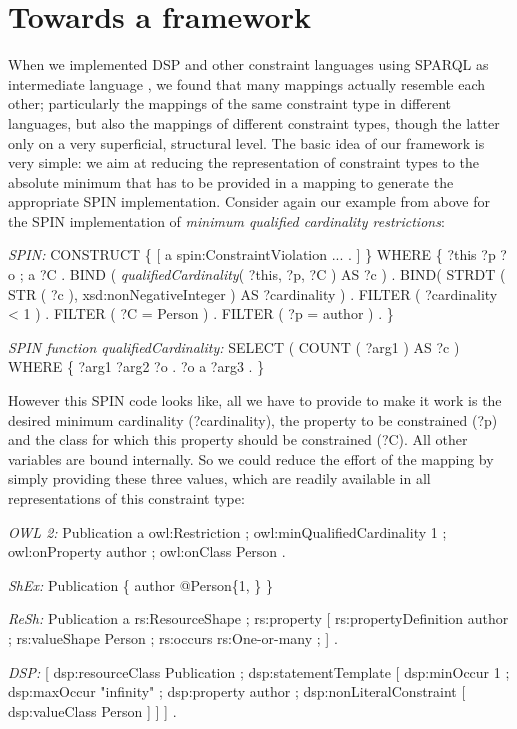\documentclass[a4paper,fontsize=11pt]{scrartcl}
\begin{document}
\section{Towards a framework} 
\label{sec:vocabulary}

When we implemented DSP and other constraint languages using SPARQL as intermediate language \cite{BoschEckert2014-2}, we found that many mappings actually resemble each other; particularly the mappings of the same constraint type in different languages, but also the mappings of different constraint types, though the latter only on a very superficial, structural level. The basic idea of our framework is very simple: we aim at reducing the representation of constraint types to the absolute minimum that has to be provided in a mapping to generate the appropriate SPIN implementation. Consider again our example from above for the SPIN implementation of \emph{minimum qualified cardinality restrictions}:

\begin{ex}[commandchars=\\\{\}]
\textit{SPIN:} CONSTRUCT \{ [ a spin:ConstraintViolation ... . ] \} WHERE \{ 
          ?this ?p ?o ; a ?C .
          BIND ( \textit{qualifiedCardinality}( ?this, ?p, ?C ) AS ?c ) .
          BIND( STRDT ( STR ( ?c ), xsd:nonNegativeInteger ) AS ?cardinality ) .
          FILTER ( ?cardinality < 1 ) . 
          FILTER ( ?C = Person ) .
          FILTER ( ?p = author ) . \}
						
\textit{SPIN function qualifiedCardinality:}										
SELECT ( COUNT ( ?arg1 ) AS ?c ) WHERE \{ ?arg1 ?arg2 ?o . ?o a ?arg3 . \}
\end{ex}

However this SPIN code looks like, all we have to provide to make it work is the desired minimum cardinality (?cardinality), the property to be constrained (?p) and the class for which this property should be constrained (?C). All other variables are bound internally. So we could reduce the effort of the mapping by simply providing these three values, which are readily available in all representations of this constraint type:

\begin{ex}[commandchars=\\\{\}]
\textit{OWL 2:} Publication a owl:Restriction ;
          owl:minQualifiedCardinality 1 ;
          owl:onProperty author ;
          owl:onClass Person .
		
\textit{ShEx:} Publication \{ author @Person\{1, \} \}

\textit{ReSh:} Publication a rs:ResourceShape ; rs:property [
          rs:propertyDefinition author ;
          rs:valueShape Person ;
          rs:occurs rs:One-or-many ; ] .
		
\textit{DSP:} [ dsp:resourceClass Publication ; dsp:statementTemplate [ 
          dsp:minOccur 1 ; dsp:maxOccur "infinity" ; 
          dsp:property author ; 
          dsp:nonLiteralConstraint [ dsp:valueClass Person ] ] ] .
\end{ex}
\end{document}
